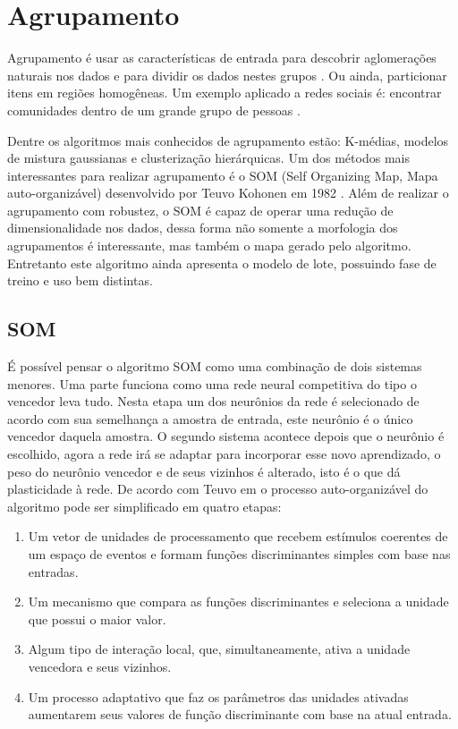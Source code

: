 \chapter{Agrupamento}
Agrupamento é usar as características de entrada para descobrir aglomerações naturais nos dados e para dividir os dados nestes grupos \cite{real2013}. Ou ainda, particionar itens em regiões homogêneas. Um exemplo aplicado a redes sociais é: encontrar comunidades dentro de um grande grupo de pessoas \cite{foundations2012}.

Dentre os algoritmos mais conhecidos de agrupamento estão: K-médias, modelos de mistura gaussianas e clusterização hierárquicas. Um dos métodos mais interessantes para realizar agrupamento é o SOM (Self Organizing Map, Mapa auto-organizável) desenvolvido por Teuvo Kohonen em 1982 \cite{kohonen1982}. Além de realizar o agrupamento com robustez, o SOM é capaz de operar uma redução de dimensionalidade nos dados, dessa forma não somente a morfologia dos agrupamentos é interessante, mas também o mapa gerado pelo algoritmo. Entretanto este algoritmo ainda apresenta o modelo de lote, possuindo fase de treino e uso bem distintas.

\section{SOM}
É possível pensar o algoritmo SOM como uma combinação de dois sistemas menores. Uma parte funciona como uma rede neural competitiva do tipo o vencedor leva tudo. Nesta etapa um dos neurônios da rede é selecionado de acordo com sua semelhança a amostra de entrada, este neurônio é o único vencedor daquela amostra. O segundo sistema acontece depois que o neurônio é escolhido, agora a rede irá se adaptar para incorporar esse novo aprendizado, o peso do neurônio vencedor e de seus vizinhos é alterado, isto é o que dá plasticidade à rede. 
De acordo com Teuvo em  o processo auto-organizável do algoritmo pode ser simplificado em quatro etapas:

\begin{enumerate}
\item Um vetor de unidades de processamento que recebem estímulos coerentes de um espaço de eventos e formam funções discriminantes simples com base nas entradas.
\item Um mecanismo que compara as funções discriminantes e seleciona a unidade que possui o maior valor.
\item Algum tipo de interação local, que, simultaneamente, ativa a unidade vencedora e seus vizinhos.
\item Um processo adaptativo que faz os parâmetros das unidades ativadas aumentarem seus valores de função discriminante com base na atual entrada.
\end{enumerate}

